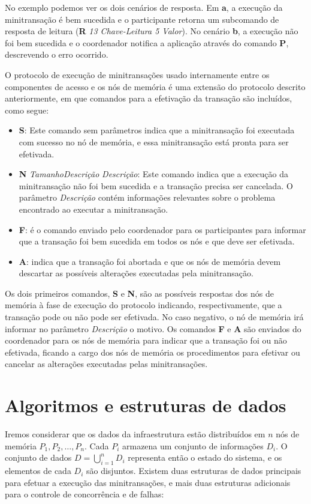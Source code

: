 \documentclass[11pt,twoside,a4paper]{book}
\begin{document}
No exemplo podemos ver os dois cenários de resposta. Em \textbf{a}, a execução da minitransação é bem sucedida e o participante retorna um subcomando de resposta de leitura (\textbf{R} \textit{13 Chave-Leitura 5 Valor}). 
No cenário \textbf{b}, a execução não foi bem sucedida e o coordenador notifica a aplicação através do comando \textbf{P}, descrevendo o erro ocorrido.

O protocolo de execução de minitransações usado internamente entre os componentes de acesso e os nós de memória é uma extensão do protocolo descrito anteriormente, em que comandos para a efetivação da transação são incluídos, como segue:

\begin{itemize}
    \item \textbf{S}: Este comando sem parâmetros indica que a minitransação foi executada com sucesso no nó de memória, e essa minitransação está pronta para ser efetivada.

    \item \textbf{N} \textit{TamanhoDescrição} \textit{Descrição}: Este comando indica que a execução da minitransação não foi bem sucedida e a transação precisa ser cancelada. O parâmetro \textit{Descrição} contém informações relevantes sobre o problema encontrado ao executar a minitransação.

    \item \textbf{F}: é o comando enviado pelo coordenador para os participantes para informar que a transação foi bem sucedida em todos os nós e que deve ser efetivada.

    \item \textbf{A}: indica que a transação foi abortada e que os nós de memória devem descartar as possíveis alterações executadas pela minitransação.
\end{itemize}

Os dois primeiros comandos, \textbf{S} e \textbf{N}, são as possíveis respostas dos nós de memória à fase de execução do protocolo indicando, respectivamente, que a transação pode ou não pode ser efetivada. No caso negativo, o nó de memória irá informar no parâmetro \textit{Descrição} o motivo. Os comandos \textbf{F} e \textbf{A} são enviados do coordenador para os nós de memória para indicar que a transação foi ou não efetivada, ficando a cargo dos nós de memória os procedimentos para efetivar ou cancelar as alterações executadas pelas minitransações.

\section{Algoritmos e estruturas de dados}
\label{sec:algoritmos}
Iremos considerar que os dados da infraestrutura estão distribuídos em $n$ nós de memória $P_1, P_2, \dotsc, P_n$. Cada $P_i$ armazena um conjunto de informações $D_i$. O conjunto de dados $D = \bigcup_{i=1}^n D_i$ representa então o estado do sistema, e os elementos de cada $D_i$ são disjuntos. Existem duas estruturas de dados principais para efetuar a execução das minitransações, e mais duas estruturas adicionais para o controle de concorrência e de falhas:
\end{document}
